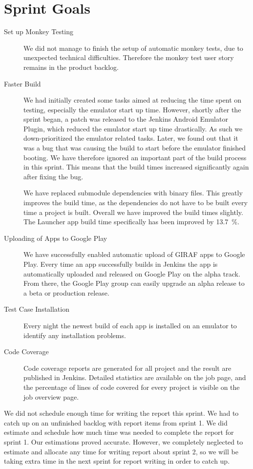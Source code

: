 \section{Sprint Goals}\label{sec:s2_goals}
\begin{description}
    \item[Set up Monkey Testing] We did not manage to finish the setup of automatic monkey tests, due to unexpected technical difficulties. Therefore the monkey test user story remains in the product backlog.
    \item[Faster Build] We had initially created some tasks aimed at reducing the time spent on testing, especially the emulator start up time. However, shortly after the sprint began, a patch was released to the Jenkins Android Emulator Plugin, which reduced the emulator start up time drastically. As such we down-prioritized the emulator related tasks. Later, we found out that it was a bug that was causing the build to start before the emulator finished booting. We have therefore ignored an important part of the build process in this sprint. This means that the build times increased significantly again after fixing the bug.

    We have replaced submodule dependencies with binary files. This greatly improves the build time, as the dependencies do not have to be built every time a project is built. Overall we have improved the build times slightly. The Launcher app build time specifically has been improved by \SI{13.7}{\percent}.
    \item[Uploading of Apps to Google Play] We have successfully enabled automatic upload of GIRAF apps to Google Play. Every time an app successfully builds in Jenkins the app is automatically uploaded and released on Google Play on the alpha track. From there, the Google Play group can easily upgrade an alpha release to a beta or production release.
    \item[Test Case Installation] Every night the newest build of each app is installed on an emulator to identify any installation problems.
    \item[Code Coverage] Code coverage reports are generated for all project and the result are published in Jenkins. Detailed statistics are available on the job page, and the percentage of lines of code covered for every project is visible on the job overview page.
\end{description}

We did not schedule enough time for writing the report this sprint. We had to catch up on an unfinished backlog with report items from sprint 1. We did estimate and schedule how much time was needed to complete the report for sprint 1. Our estimations proved accurate. However, we completely neglected to estimate and allocate any time for writing report about sprint 2, so we will be taking extra time in the next sprint for report writing in order to catch up.

